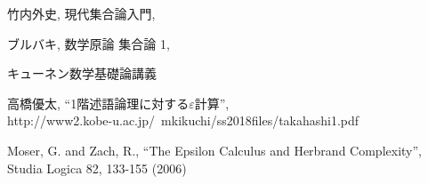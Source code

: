 \begin{thebibliography}{数字}
	 竹内外史, 現代集合論入門, 
	
	 ブルバキ, 数学原論 集合論 1, 
	
	 キューネン数学基礎論講義
	
	 高橋優太, ``1階述語論理に対する$\varepsilon$計算'', \\
		http://www2.kobe-u.ac.jp/~mkikuchi/ss2018files/takahashi1.pdf 
	
	 Moser, G. and Zach, R., ``The Epsilon Calculus and Herbrand Complexity'',
		Studia Logica 82, 133-155 (2006)
\end{thebibliography}